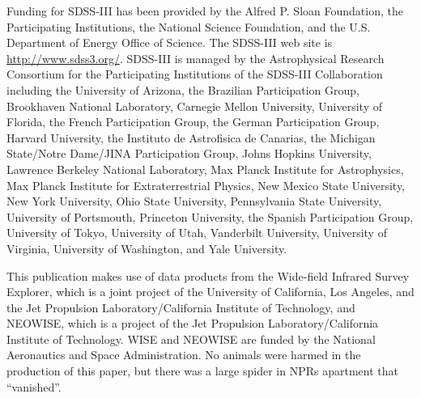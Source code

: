 \documentclass[fleqn,usenatbib]{mnras}
\begin{document}
Funding for SDSS-III has been provided by the Alfred P. Sloan
Foundation, the Participating Institutions, the National Science
Foundation, and the U.S. Department of Energy Office of Science. The
SDSS-III web site is
\href{http://www.sdss3.org/}{http://www.sdss3.org/}.
SDSS-III is managed by the Astrophysical Research Consortium for the
Participating Institutions of the SDSS-III Collaboration including the
University of Arizona, the Brazilian Participation Group, Brookhaven
National Laboratory, Carnegie Mellon University, University of
Florida, the French Participation Group, the German Participation
Group, Harvard University, the Instituto de Astrofisica de Canarias,
the Michigan State/Notre Dame/JINA Participation Group, Johns Hopkins
University, Lawrence Berkeley National Laboratory, Max Planck
Institute for Astrophysics, Max Planck Institute for Extraterrestrial
Physics, New Mexico State University, New York University, Ohio State
University, Pennsylvania State University, University of Portsmouth,
Princeton University, the Spanish Participation Group, University of
Tokyo, University of Utah, Vanderbilt University, University of
Virginia, University of Washington, and Yale University.

This publication makes use of data products from the Wide-field
Infrared Survey Explorer, which is a joint project of the University
of California, Los Angeles, and the Jet Propulsion
Laboratory/California Institute of Technology, and NEOWISE, which is a
project of the Jet Propulsion Laboratory/California Institute of
Technology. WISE and NEOWISE are funded by the National Aeronautics
and Space Administration. No animals were harmed in the production of
this paper, but there was a large spider in NPRs apartment that
``vanished''.





\bsp	%
\label{lastpage}
\end{document}
